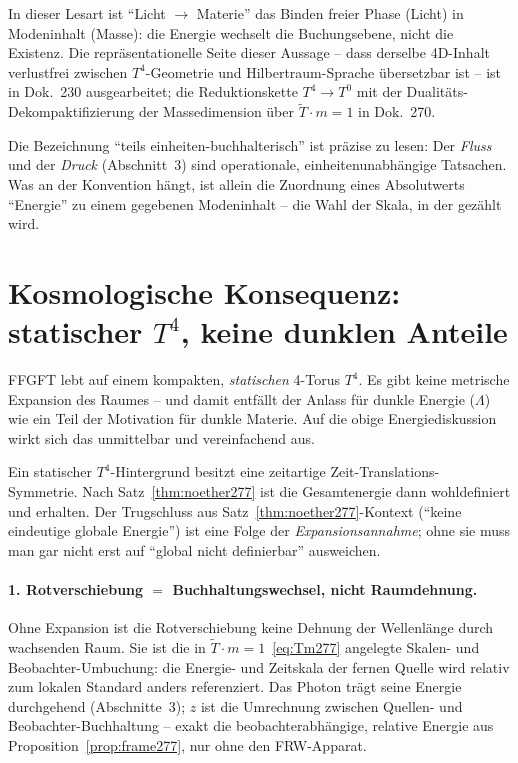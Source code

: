 In dieser Lesart ist \enquote{Licht $\to$ Materie} das Binden freier Phase
(Licht) in Modeninhalt (Masse): die Energie wechselt die Buchungsebene, nicht
die Existenz. Die repräsentationelle Seite dieser Aussage -- dass derselbe
4D-Inhalt verlustfrei zwischen $T^4$-Geometrie und Hilbertraum-Sprache
übersetzbar ist -- ist in Dok.~230 ausgearbeitet; die Reduktionskette
$T^4\to T^0$ mit der Dualitäts-Dekompaktifizierung der Massedimension über
$\tilde T\cdot m=1$ in Dok.~270.

\begin{remark}
Die Bezeichnung \enquote{teils einheiten-buchhalterisch} ist präzise zu lesen:
Der \emph{Fluss} und der \emph{Druck} (Abschnitt~3) sind operationale,
einheitenunabhängige Tatsachen. Was an der Konvention hängt, ist allein die
Zuordnung eines Absolutwerts \enquote{Energie} zu einem gegebenen
Modeninhalt -- die Wahl der Skala, in der gezählt wird.
\end{remark}

\section{Kosmologische Konsequenz: statischer $T^4$, keine dunklen Anteile}
\label{sec:kosmo277}

FFGFT lebt auf einem kompakten, \emph{statischen} 4-Torus $T^4$. Es gibt keine
metrische Expansion des Raumes -- und damit entfällt der Anlass für dunkle
Energie ($\Lambda$) wie ein Teil der Motivation für dunkle Materie. Auf die
obige Energiediskussion wirkt sich das unmittelbar und vereinfachend aus.

\begin{proposition}
\label{prop:global277}
Ein statischer $T^4$-Hintergrund besitzt eine zeitartige Zeit-Translations-%
Symmetrie. Nach Satz~\ref{thm:noether277} ist die Gesamtenergie dann
wohldefiniert und erhalten. Der Trugschluss aus Satz~\ref{thm:noether277}-Kontext
(\enquote{keine eindeutige globale Energie}) ist eine Folge der
\emph{Expansionsannahme}; ohne sie muss man gar nicht erst auf \enquote{global
nicht definierbar} ausweichen.
\end{proposition}

\paragraph{1. Rotverschiebung $=$ Buchhaltungswechsel, nicht Raumdehnung.}
Ohne Expansion ist die Rotverschiebung keine Dehnung der Wellenlänge durch
wachsenden Raum. Sie ist die in $\tilde T\cdot m = 1$~\eqref{eq:Tm277} angelegte
Skalen- und Beobachter-Umbuchung: die Energie- und Zeitskala der fernen Quelle
wird relativ zum lokalen Standard anders referenziert. Das Photon trägt seine
Energie durchgehend (Abschnitte~3); $z$ ist die Umrechnung zwischen Quellen-
und Beobachter-Buchhaltung -- exakt die beobachterabhängige, relative Energie
aus Proposition~\ref{prop:frame277}, nur ohne den FRW-Apparat.

